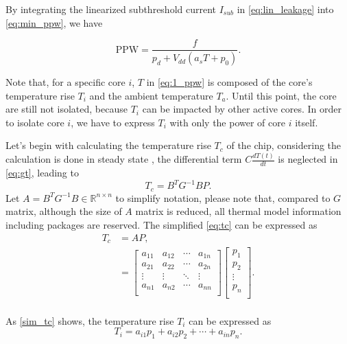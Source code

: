 By integrating the linearized subthreshold current $I_{sub}$ in \eqref{eq:lin_leakage} into \eqref{eq:min_ppw}, we have

\begin{equation}\label{eq:1_ppw}
\text{PPW} = \frac{f}{p_{d}+V_{dd}(a_{s}T+p_{0})}.
\end{equation}

Note that, for a specific core $i$, $T$ in \eqref{eq:1_ppw} is composed of the core's temperature rise $T_{i}$ and the ambient temperature $T_{a}$. Until this point, the core are still not isolated, because $T_{i}$ can be impacted by other active cores. In order to isolate core $i$, we have to express $T_{i}$ with only the power of core $i$ itself.

Let's begin with calculating the temperature rise $T_{c}$ of the chip, considering the calculation is done in steady state , the differential term $C\frac{dT(t)}{dt}$ is neglected in \eqref{eq:gt}, leading to
\begin{equation}\label{eq:tc}
T_{c} = B^{T}G^{-1}BP.
\end{equation}
Let $A = B^{T}G^{-1}B \in \mathbb{R}^{n \times n}$ to simplify notation, please note that, compared to $G$ matrix, although the size of $A$ matrix is reduced, all thermal model information including packages are reserved. The simplified 
\eqref{eq:tc} can be expressed as
\begin{equation}\label{sim_tc}
\begin{split}
T_{c} &= AP,\\
&=
{\left[
\begin{matrix}
 a_{11} & a_{12} & \cdots & a_{1n} \\
 a_{21} & a_{22} & \cdots & a_{2n} \\
 \vdots & \vdots & \ddots & \vdots \\
 a_{n1} & a_{n2} & \cdots & a_{nn} \\
\end{matrix}
\right]}
{\left[
\begin{matrix}
 p_{1}   \\
 p_{2}   \\
 \vdots  \\
 p_{n}   \\
\end{matrix}
\right]}.\\
\end{split}
\end{equation}

As \eqref{sim_tc} shows, the temperature rise $T_{i}$ can be expressed as
\begin{equation}\label{eq:ti}
T_{i} =a_{i1}p_{1} + a_{i2}p_{2} +\cdots + a_{in}p_{n}. 
\end{equation}

